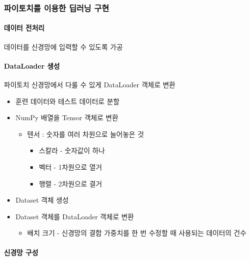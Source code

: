 \documentclass[]{article}
\let\oldparagraph\paragraph
\renewcommand{\paragraph}[1]{\oldparagraph{#1}\mbox{}}
\begin{document}
\hypertarget{header-n139}{%
\subsubsection{파이토치를 이용한 딥러닝 구현}\label{header-n139}}

\hypertarget{header-n141}{%
\paragraph{데이터 전처리}\label{header-n141}}

데이터를 신경망에 입력할 수 있도록 가공

\hypertarget{header-n143}{%
\paragraph{DataLoader 생성}\label{header-n143}}

파이토치 신경망에서 다룰 수 있게 DataLoader 객체로 변환

\begin{itemize}
\item
  훈련 데이터와 테스트 데이터로 분할
\item
  NumPy 배열을 Tensor 객체로 변환

  \begin{itemize}
  \item
    텐서 : 숫자를 여러 차원으로 늘어놓은 것

    \begin{itemize}
    \item
      스칼라 - 숫자값이 하나
    \item
      벡터 - 1차원으로 열거
    \item
      행렬 - 2차원으로 결거
    \end{itemize}
  \end{itemize}
\item
  Dataset 객체 생성
\item
  Dataset 객체를 DataLoader 객체로 변환

  \begin{itemize}
  \item
    배치 크기 - 신경망의 결합 가중치를 한 번 수정할 때 사용되는 데이터의
    건수
  \end{itemize}
\end{itemize}

\hypertarget{header-n167}{%
\paragraph{신경망 구성}\label{header-n167}}
\end{document}
